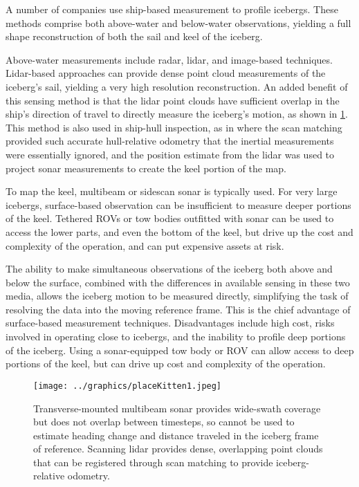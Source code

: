 A number of companies use ship-based measurement to profile icebergs. These methods comprise both above-water and below-water observations, yielding a full shape reconstruction of both the sail and keel of the iceberg. 

Above-water measurements include radar, lidar, and image-based techniques. Lidar-based approaches can provide dense point cloud measurements of the iceberg's sail, yielding a very high resolution reconstruction. An added benefit of this sensing method is that the lidar point clouds have sufficient overlap in the ship's direction of travel to directly measure the iceberg's motion, as shown in \ref{fig:LidarOdometry}. This method is also used in ship-hull inspection, as in \cite{Singapore} where the scan matching provided such accurate hull-relative odometry that the inertial measurements were essentially ignored, and the position estimate from the lidar was used to project sonar measurements to create the keel portion of the map.

To map the keel, multibeam or sidescan sonar is typically used. For very large icebergs, surface-based observation can be insufficient to measure deeper portions of the keel. Tethered ROVs or tow bodies outfitted with sonar can be used to access the lower parts, and even the bottom of the keel, but drive up the cost and complexity of the operation, and can put expensive assets at risk. 

The ability to make simultaneous observations of the iceberg both above and below the surface, combined with the differences in available sensing in these two media, allows the iceberg motion to be measured directly, simplifying the task of resolving the data into the moving reference frame. This is the chief advantage of surface-based measurement techniques. Disadvantages include high cost, risks involved in operating close to icebergs, and the inability to profile deep portions of the iceberg. Using a sonar-equipped tow body or ROV can allow access to deep portions of the keel, but can drive up cost and complexity of the operation. 

\begin{figure}[htbp]
   \centering
   \texttt{[image: ../graphics/placeKitten1.jpeg]} %
   \caption{Transverse-mounted multibeam sonar provides wide-swath coverage but does not overlap between timesteps, so cannot be used to estimate heading change and distance traveled in the iceberg frame of reference. Scanning lidar provides dense, overlapping point clouds that can be registered through scan matching to provide iceberg-relative odometry. }
   \label{fig:LidarOdometry}
\end{figure}

